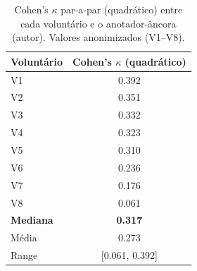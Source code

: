 \begin{table}[H]
\centering
\caption{Cohen's $\kappa$ par-a-par (quadrático) entre cada voluntário e o anotador-âncora (autor). Valores anonimizados (V1--V8).}
\label{tab:iaa_kappa}
\begin{tabular}{l c}
\toprule
\textbf{Voluntário} & \textbf{Cohen's $\kappa$ (quadrático)} \\
\midrule
V1 & 0.392 \\
V2 & 0.351 \\
V3 & 0.332 \\
V4 & 0.323 \\
V5 & 0.310 \\
V6 & 0.236 \\
V7 & 0.176 \\
V8 & 0.061 \\
\midrule
\textbf{Mediana} & \textbf{0.317} \\
Média & 0.273 \\
Range & [0.061, 0.392] \\
\bottomrule
\end{tabular}
\end{table}